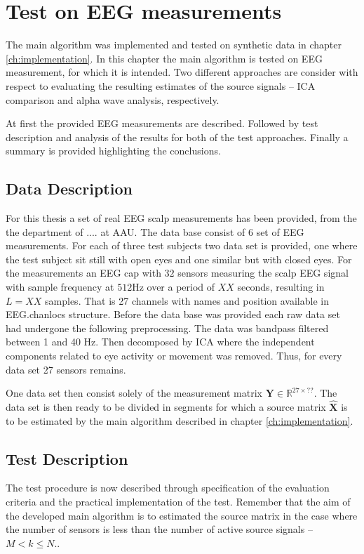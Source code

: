 \chapter{Test on EEG measurements}\label{ch:eeg_test}
The main algorithm was implemented and tested on synthetic data in chapter \ref{ch:implementation}. In this chapter the main algorithm is tested on EEG measurement, for which it is intended. Two different approaches are consider with respect to evaluating the resulting estimates of the source signals -- ICA comparison and alpha wave analysis, respectively.

At first the provided EEG measurements are described. Followed by test description and analysis of the results for both of the test approaches. 
Finally a summary is provided highlighting the conclusions.  

\section{Data Description}
For this thesis a set of real EEG scalp measurements has been provided, from the the department of .... at AAU. 
The data base consist of 6 set of EEG measurements. For each of three test subjects two data set is provided, one where the test subject sit still with open eyes and one similar but with closed eyes.  
For the measurements an EEG cap with $32$ sensors measuring the scalp EEG signal with sample frequency at $512$Hz over a period of $XX$ seconds, resulting in $L = XX$ samples. That is 27 channels with names and position available in EEG.chanlocs structure.   
Before the data base was provided each raw data set had undergone the following preprocessing.
The data was bandpass filtered between 1 and 40 Hz. Then decomposed by ICA where the independent components related to eye activity or movement was removed. Thus, for every data set 27 sensors remains. 

One data set then consist solely of the measurement matrix $\mathbf{Y} \in \mathbb{R}^{27\times ??}$. The data set is then ready to be divided in segments for which a source matrix $\hat{\textbf{X}}$ is to be estimated by the main algorithm described in chapter \ref{ch:implementation}.

\section{Test Description}
The test procedure is now described through specification of the evaluation criteria and the practical implementation of the test.
Remember that the aim of the developed main algorithm is to estimated the source matrix in the case where the number of sensors is less than the number of active source signals -- $M<k\leq N.$.

